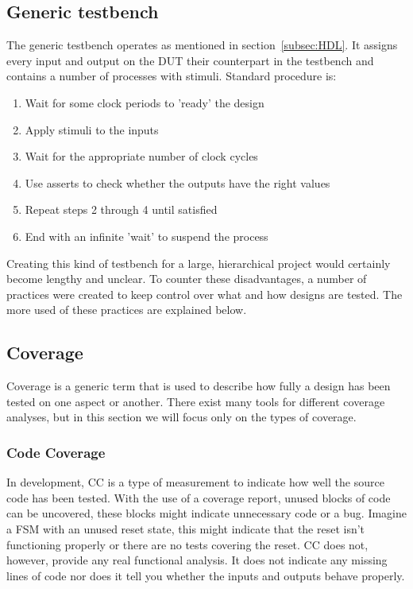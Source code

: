\documentclass[11pt,british]{article}
\begin{document}
\subsection{Generic testbench}
The generic testbench operates as mentioned in section~\ref{subsec:HDL}. It assigns every input and output on the \gls{DUT} their counterpart in the testbench and contains a number of processes with stimuli. Standard procedure is:
\begin{enumerate}%
\item Wait for some clock periods to 'ready' the design
\item Apply stimuli to the inputs
\item Wait for the appropriate number of clock cycles
\item Use asserts to check whether the outputs have the right values
\item Repeat steps 2 through 4 until satisfied
\item End with an infinite 'wait' to suspend the process
\end{enumerate}
Creating this kind of testbench for a large, hierarchical project would certainly become lengthy and unclear. To counter these disadvantages, a number of practices were created to keep control over what and how designs are tested. The more used of these practices are explained below.

\subsection{Coverage}
Coverage is a generic term that is used to describe how fully a design has been tested on one aspect or another. There exist many tools for different coverage analyses, but in this section we will focus only on the types of coverage.

\subsubsection{Code Coverage}
In development, \gls{CC} is a type of measurement to indicate how well the source code has been tested. With the use of a coverage report, unused blocks of code can be uncovered, these blocks might indicate unnecessary code or a bug. Imagine a \gls{FSM} with an unused reset state, this might indicate that the reset isn't functioning properly or there are no tests covering the reset. CC does not, however, provide any real functional analysis. It does not indicate any missing lines of code nor does it tell you whether the inputs and outputs behave properly.
\end{document}
